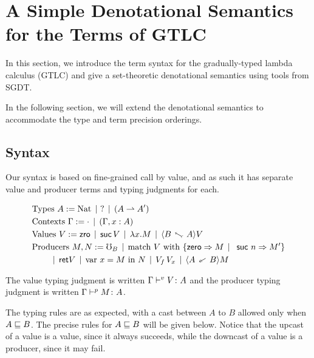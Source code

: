 \section{A Simple Denotational Semantics for the Terms of GTLC}\label{sec:gtlc-terms}

In this section, we introduce the term syntax for the gradually-typed
lambda calculus (GTLC) and give a set-theoretic denotational semantics
using tools from SGDT.

In the following section, we will extend the denotational semantics to accommodate
the type and term precision orderings.


\subsection{Syntax}\label{sec:term-syntax}

Our syntax is based on fine-grained call by value, and as such it has
separate value and producer terms and typing judgments for each.



\begin{align*}
  &\text{Types } A := \nat \alt \,\dyn \alt (A \ra A') \\
  &\text{Contexts } \Gamma := \cdot \alt (\Gamma, x : A) \\
  &\text{Values } V :=  \zro \alt \suc\, V \alt \lda{x}{M} \alt \up{A}{B} V \\ 
  &\text{Producers } M, N := \err_B \alt \matchnat {V} {M} {n} {M'} \\ 
  &\quad\quad \alt \ret {V} \alt \bind{x}{M}{N} \alt V_f\, V_x \alt \dn{A}{B} M 
\end{align*}


The value typing judgment is written ${\Gamma} \vdash^v {V} \colon {A}$ and 
the producer typing judgment is written ${\Gamma} \vdash^p {M} \colon {A}$.

The typing rules are as expected, with a cast between $A$ to $B$ allowed only when $A \sqsubseteq B$.
The precise rules for $A \sqsubseteq B$ will be given below.
Notice that the upcast of a value is a value, since it always succeeds, while the downcast
of a value is a producer, since it may fail.


